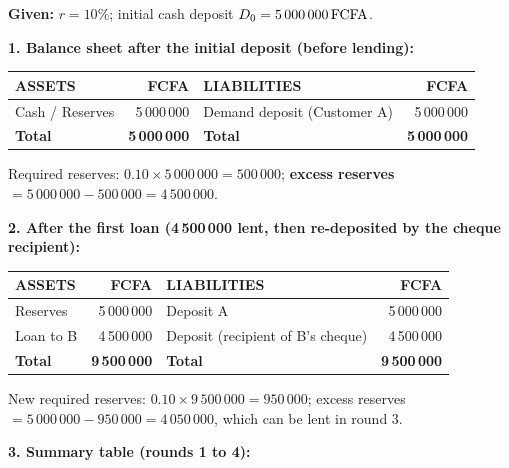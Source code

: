 \documentclass[11pt]{article}
\begin{document}
\begin{corrige}

\textbf{Given:} $r = 10\%$; initial cash deposit $D_0 = \SI{5\,000\,000}{FCFA}$.

\textbf{1. Balance sheet after the initial deposit (before lending):}

\begin{center}
\begin{tabularx}{\linewidth}{|X r|X r|}
\hline
\rowcolor{popblueL} \textbf{ASSETS} & \textbf{FCFA} & \textbf{LIABILITIES} & \textbf{FCFA} \\
\hline
Cash / Reserves & 5\,000\,000 & Demand deposit (Customer A) & 5\,000\,000 \\
\hline
\rowcolor{popgreenL} \textbf{Total} & \textbf{5\,000\,000} & \textbf{Total} & \textbf{5\,000\,000} \\
\hline
\end{tabularx}
\end{center}

Required reserves: $0.10 \times 5\,000\,000 = 500\,000$; \textbf{excess reserves} $= 5\,000\,000 - 500\,000 = 4\,500\,000$.

\textbf{2. After the first loan (4\,500\,000 lent, then re-deposited by the cheque recipient):}

\begin{center}
\begin{tabularx}{\linewidth}{|X r|X r|}
\hline
\rowcolor{popblueL} \textbf{ASSETS} & \textbf{FCFA} & \textbf{LIABILITIES} & \textbf{FCFA} \\
\hline
Reserves & 5\,000\,000 & Deposit A & 5\,000\,000 \\
\hline
Loan to B & 4\,500\,000 & Deposit (recipient of B's cheque) & 4\,500\,000 \\
\hline
\rowcolor{popgreenL} \textbf{Total} & \textbf{9\,500\,000} & \textbf{Total} & \textbf{9\,500\,000} \\
\hline
\end{tabularx}
\end{center}

New required reserves: $0.10 \times 9\,500\,000 = 950\,000$; excess reserves $= 5\,000\,000 - 950\,000 = 4\,050\,000$, which can be lent in round 3.

\textbf{3. Summary table (rounds 1 to 4):}


\end{corrige}
\end{document}

